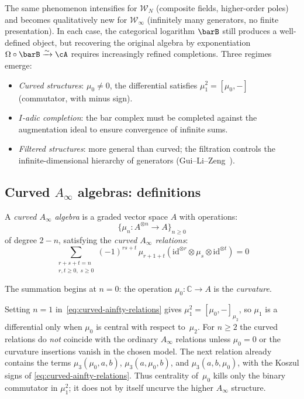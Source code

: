 The same phenomenon intensifies for $\mathcal{W}_N$ (composite
fields, higher-order poles) and becomes qualitatively new for
$\mathcal{W}_\infty$ (infinitely many generators, no finite
presentation). In each case, the categorical logarithm $\barB$
still produces a well-defined object, but recovering the original
algebra by exponentiation $\Omega \circ \barB \xrightarrow{\sim} \cA$
requires increasingly refined completions. Three regimes emerge:
\begin{itemize}
\item \emph{Curved structures}: $\mu_0 \neq 0$, the differential
 satisfies $\mu_1^2 = [\mu_0, -]$ (commutator, with minus sign).
\item \emph{$I$-adic completion}: the bar complex must be completed
 against the augmentation ideal to ensure convergence of infinite sums.
\item \emph{Filtered structures}: more general than curved; the
 filtration controls the infinite-dimensional hierarchy of generators
 (Gui--Li--Zeng~\cite{GLZ22}).
\end{itemize}

\subsection{Curved $A_\infty$ algebras: definitions}
\label{sec:curved-ainfty-definition}

\begin{definition}
\label{def:curved-ainfty}
\label{ex:curved-ainfty-complete}
A \emph{curved $A_\infty$ algebra} is a graded vector space $A$ with operations:
\begin{equation}
\{\mu_n: A^{\otimes n} \to A\}_{n \geq 0}
\end{equation}
of degree $2-n$, satisfying the \emph{curved $A_\infty$ relations}:
\begin{equation}\label{eq:curved-ainfty-relations}
\sum_{\substack{r+s+t=n \\ r,t \geq 0,\; s \geq 0}} (-1)^{rs+t}\, \mu_{r+1+t}(\mathrm{id}^{\otimes r} \otimes \mu_s \otimes \mathrm{id}^{\otimes t}) = 0
\end{equation}

The summation begins at $n = 0$: the operation
$\mu_0 \colon \mathbb{C} \to A$ is the \emph{curvature}.
\end{definition}

\begin{remark}
\label{rem:curved-ainfty-low-n}
Setting $n = 1$ in~\eqref{eq:curved-ainfty-relations} gives
$\mu_1^2 = [\mu_0, -]_{\mu_2}$, so $\mu_1$ is a differential
only when $\mu_0$ is central with respect to~$\mu_2$.
For $n \geq 2$ the curved relations do \emph{not} coincide with
the ordinary $A_\infty$ relations unless $\mu_0=0$ or the
curvature insertions vanish in the chosen model. The next relation
already contains the terms
$\mu_3(\mu_0,a,b)$, $\mu_3(a,\mu_0,b)$, and
$\mu_3(a,b,\mu_0)$, with the Koszul signs of
\eqref{eq:curved-ainfty-relations}. Thus centrality of~$\mu_0$
kills only the binary commutator in $\mu_1^2$; it does not by
itself uncurve the higher $A_\infty$ structure.
\end{remark}

